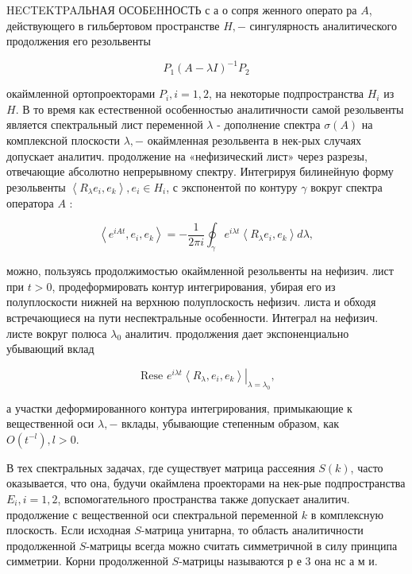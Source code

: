 \documentclass[10pt]{article}
\begin{document}
HECTEKTPAЛЬНАЯ ОСОБEHНОСТЬ с а о сопря женного операто ра $A$, действующего в гильбертовом пространстве $H,-$ сингулярность аналитического продолжения его резольвенты



\[

P_{1}(A-\lambda I)^{-1} P_{2}

\]



окаймленной ортопроекторами $P_{i}, i=1,2$, на некоторые подпространства $H_{i}$ из $H$. В то время как естественной особенностью аналитичности самой резольвенты является спектральный лист переменной $\lambda$ - дополнение спектра $\sigma(A)$ на комплексной плоскости $\lambda,-$ окаймленная резольвента в нек-рых случаях допускает аналитич. продолжение на «нефизический лист» через разрезы, отвечающие абсолютно непрерывному спектру. Интегрируя билинейную форму резольвенты $\left\langle R_{\lambda} e_{i}, e_{k}\right\rangle, e_{i} \in H_{i}$, с экспонентой по контуру $\gamma$ вокруг спектра оператора $A$ :



\[

\left\langle e^{i A t}, e_{i}, e_{k}\right\rangle=-\frac{1}{2 \pi i} \oint_{\gamma} e^{i \lambda t}\left\langle R_{\lambda} e_{i}, e_{k}\right\rangle d \lambda,

\]



можно, пользуясь продолжимостью окаймленной резольвенты на нефизич. лист при $t>0$, продеформировать контур интегрирования, убирая его из полуплоскости нижней на верхнюю полуплоскость нефизич. листа и обходя встречающиеся на пути неспектральные особенности. Интеграл на нефизич. листе вокруг полюса $\lambda_{0}$ аналитич. продолжения дает экспоненциально убывающий вклад



\[

\text { Rese }\left.e^{i \lambda t}\left\langle R_{\lambda}, e_{i}, e_{k}\right\rangle\right|_{\lambda=\lambda_{0}},

\]



а участки деформированного контура интегрирования, примыкающие к вещественной оси $\lambda,-$ вклады, убывающие степенным образом, как $O\left(t^{-l}\right), l>0$.



В тех спектральных задачах, где существует матрица рассеяния $S(k)$, часто оказывается, что она, будучи окаймлена проекторами на нек-рые подпространства $E_{i}, i=1,2$, вспомогательного пространства также допускает аналитич. продолжение с вещественной оси спектральной переменной $k$ в комплексную плоскость. Если исходная $S$-матрица унитарна, то область аналитичности продолженной $S$-матрицы всегда можно считать симметричной в силу принципа симметрии. Корни продолженной $S$-матрицы называются р е 3 она нс а м и.
\end{document}
